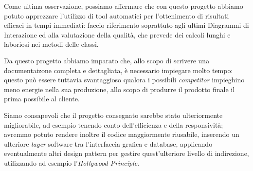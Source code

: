 Come ultima osservazione, possiamo affermare che con questo progetto abbiamo 
potuto apprezzare l'utilizzo di tool automatici per l'ottenimento di risultati
efficaci in tempi immediati: faccio riferimento soprattuto agli ultimi Diagrammi
di Interazione ed alla valutazione della qualità, che prevede dei calcoli lunghi
e laboriosi nei metodi delle classi.

Da questo progetto abbiamo imparato che, allo scopo di scrivere una documentaizone
completa e dettagliata, è necessario impiegare molto tempo: questo può essere
tuttavia svantaggioso qualora i possibili \textit{competitor} impieghino meno 
energie nella sua produzione, allo scopo di produrre il prodotto finale il 
prima possibile al cliente. 

Siamo consapevoli che il progetto consegnato sarebbe stato ulteriormente migliorabile,
ad esempio tenendo conto dell'efficienza e della responsività; avremmo potuto
rendere inoltre il codice maggiormente riusabile, inserendo un ulteriore 
\textit{layer} software tra l'interfaccia grafica e database, applicando eventualmente
altri design pattern per gestire quest'ulteriore livello di indirezione, utilizzando
ad esempio l'\textit{Hollywood Principle}.
